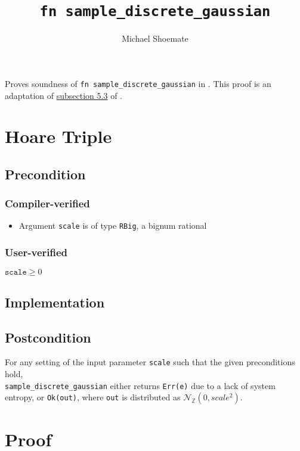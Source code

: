 \documentclass{article}
\title{\texttt{fn sample\_discrete\_gaussian}}
\author{Michael Shoemate}
\begin{document}
 
\maketitle 
 
Proves soundness of \texttt{fn sample\_discrete\_gaussian} in . 
This proof is an adaptation of \href{https://arxiv.org/pdf/2004.00010.pdf#subsection.5.3}{subsection 5.3} of \cite{CKS20}. 
 
\section{Hoare Triple} 
\subsection*{Precondition} 
\subsubsection*{Compiler-verified} 
\begin{itemize} 
    \item Argument \texttt{scale} is of type \texttt{RBig}, a bignum rational 
\end{itemize} 
 
\subsubsection*{User-verified} 
$\texttt{scale} \geq 0$ 
 
\subsection*{Implementation} 
 
 
\subsection*{Postcondition} 
\label{postcondition} 
For any setting of the input parameter \texttt{scale} such that the given preconditions hold, \\ 
\texttt{sample\_discrete\_gaussian} either returns \texttt{Err(e)} due to a lack of system entropy, 
or \texttt{Ok(out)}, where \texttt{out} is distributed as $\mathcal{N}_\mathbb{Z}(0, scale^2)$. 
 
\section{Proof} 
 
\end{document}
